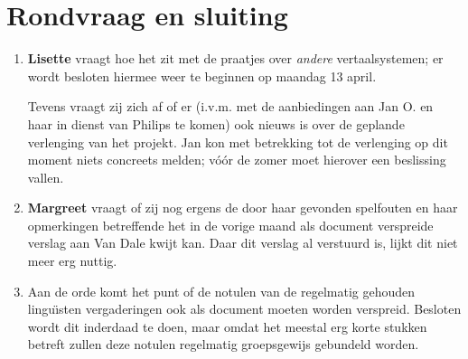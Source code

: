 \section {Rondvraag en sluiting}
\begin{enumerate}
   \item {\bf Lisette} vraagt hoe het zit met de praatjes over {\em andere}
         vertaalsystemen; er wordt besloten hiermee weer te beginnen op 
         maandag 13 april.

         Tevens vraagt zij zich af of er (i.v.m. met de aanbiedingen aan Jan O. 
         en haar in dienst van Philips te komen) ook nieuws is over de geplande
         verlenging van het projekt. Jan kon met betrekking tot de verlenging
         op dit moment niets concreets melden; v\'{o}\'{o}r de zomer moet 
         hierover een beslissing vallen.

   \item {\bf Margreet} vraagt of zij nog ergens de door haar gevonden 
         spelfouten en haar opmerkingen betreffende het in de vorige maand 
         als document verspreide verslag aan Van Dale kwijt kan. Daar dit 
         verslag al verstuurd is, lijkt dit niet meer erg nuttig.
          
   \item Aan de orde komt het punt of de notulen van de regelmatig gehouden 
         lingu\"{\i}sten vergaderingen ook als document moeten worden verspreid.
         Besloten wordt dit inderdaad te doen, maar omdat het meestal erg korte
         stukken betreft zullen deze notulen regelmatig groepsgewijs gebundeld 
         worden.
\end{enumerate}


